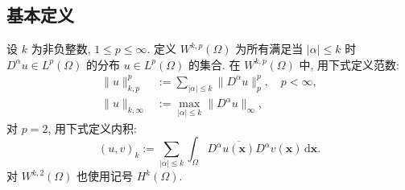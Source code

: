 \subsection{基本定义}\label{sec:sobolev-basic-definitions}

\begin{Definition}
\label{def:sobolev-positive-integer-spaces}
设 $k$ 为非负整数, $1\leq p\leq\infty$. 定义 $W^{k,p}(\Omega)$ 为所有满足当 $|\alpha|\leq k$ 时 $D^\alpha u\in L^p(\Omega)$ 的分布 $u\in L^p(\Omega)$ 的集合. 在 $W^{k,p}(\Omega)$ 中, 用下式定义范数:
\begin{equation}\label{eq:sobolev-positive-integer-norm-definition}
\begin{aligned}
\|u\|_{k,p}^p&:=\sum_{|\alpha|\leq k}\|D^\alpha u\|_p^p,\quad p<\infty,\\
\|u\|_{k,\infty}&:=\max_{|\alpha|\leq k}\|D^\alpha u\|_{\infty},
\end{aligned}
\end{equation}
对 $p=2$, 用下式定义内积:
\begin{equation}\label{eq:sobolev-hilbert-inner-product-definition}
(u,v)_k:=\sum_{|\alpha|\leq k}\int_{\Omega}D^\alpha\overline{u(\bm{x})}D^\alpha v(\bm{x})\,\mathrm{d}\bm{x}.
\end{equation}
对 $W^{k,2}(\Omega)$ 也使用记号 $H^k(\Omega)$.
\end{Definition}

